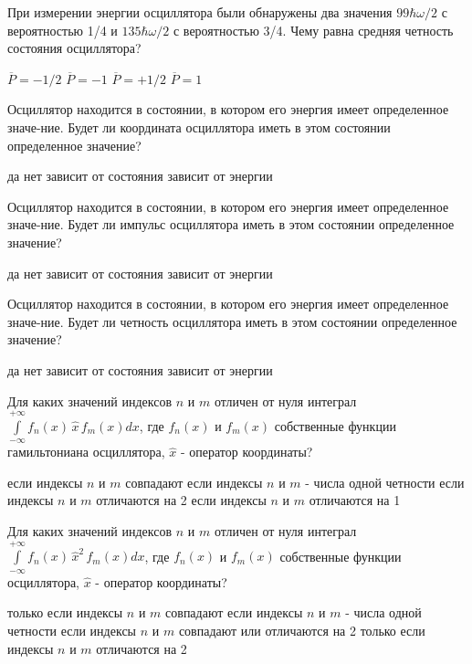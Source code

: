 \documentclass[11pt,a4paper]{exam}
\begin{document}
\begin{questions}
\question При измерении энергии осциллятора были обнаружены два значения $99\hbar \omega /2$ с вероятностью 1/4 и $135\hbar \omega /2$ с вероятностью 3/4. Чему равна средняя четность состояния осциллятора?
\begin{choices}
\choice $\overline{P}=-1/2$     
\choice $\overline{P}=-1$    
\choice $\overline{P}=+1/2$     
\choice $\overline{P}=1$
\end{choices}

\question Осциллятор находится в состоянии, в котором его энергия имеет определенное значе-ние. Будет ли координата осциллятора иметь в этом состоянии определенное значение?
\begin{choices}
\choice да    
\choice нет      
\choice зависит от состояния    
\choice зависит от энергии
\end{choices}

\question Осциллятор находится в состоянии, в котором его энергия имеет определенное значе-ние. Будет ли импульс осциллятора иметь в этом состоянии определенное значение?
\begin{choices}
\choice да    
\choice нет      
\choice зависит от состояния    
\choice зависит от энергии
\end{choices}

\question Осциллятор находится в состоянии, в котором его энергия имеет определенное значе-ние. Будет ли четность осциллятора иметь в этом состоянии определенное значение?
\begin{choices}
\choice да    
\choice нет      
\choice зависит от состояния    
\choice зависит от энергии
\end{choices}

\question Для каких значений индексов $n$ и $m$ отличен от нуля интеграл $\int\limits_{-\infty }^{+\infty }{{{f}_{n}}(x)\,\hat{x}\,{{f}_{m}}(x)dx}$, где ${{f}_{n}}(x)$ и ${{f}_{m}}(x)$ собственные функции гамильтониана осциллятора, $\hat{x}$ - оператор координаты?
\begin{choices}
\choice если индексы $n$ и $m$ совпадают
\choice если индексы $n$ и $m$ - числа одной четности
\choice если индексы $n$ и $m$ отличаются на 2
\choice если индексы $n$ и $m$ отличаются на 1
\end{choices}

\question Для каких значений индексов $n$ и $m$ отличен от нуля интеграл $\int\limits_{-\infty }^{+\infty }{{{f}_{n}}(x)\,{{{\hat{x}}}^{2}}\,{{f}_{m}}(x)dx}$, где ${{f}_{n}}(x)$ и ${{f}_{m}}(x)$ собственные функции осциллятора, $\hat{x}$ - оператор координаты?
\begin{choices}
\choice только если индексы $n$ и $m$ совпадают
\choice если индексы $n$ и $m$ - числа одной четности
\choice если индексы $n$ и $m$ совпадают или отличаются на 2
\choice только если индексы $n$ и $m$ отличаются на 2
\end{choices}


\end{questions}
\end{document}
